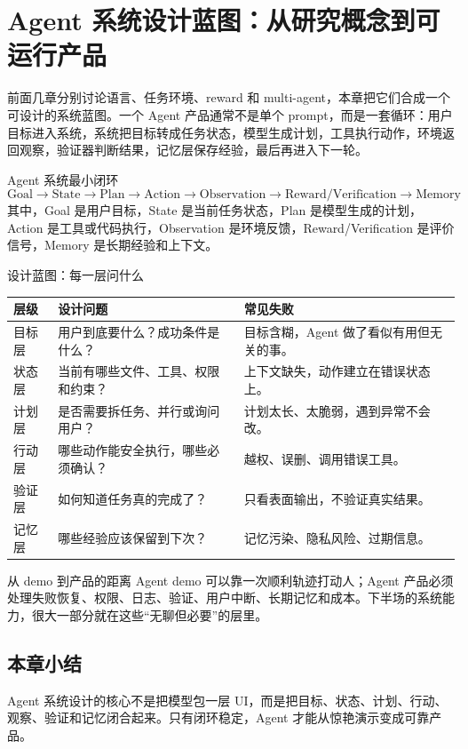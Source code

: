 \section{Agent 系统设计蓝图：从研究概念到可运行产品}

前面几章分别讨论语言、任务环境、reward 和 multi-agent，本章把它们合成一个可设计的系统蓝图。一个 Agent 产品通常不是单个 prompt，而是一套循环：用户目标进入系统，系统把目标转成任务状态，模型生成计划，工具执行动作，环境返回观察，验证器判断结果，记忆层保存经验，最后再进入下一轮。

\begin{importantbox}{Agent 系统最小闭环}
\[
\text{Goal} \rightarrow \text{State} \rightarrow \text{Plan} \rightarrow \text{Action} \rightarrow \text{Observation} \rightarrow \text{Reward/Verification} \rightarrow \text{Memory}
\]
其中，Goal 是用户目标，State 是当前任务状态，Plan 是模型生成的计划，Action 是工具或代码执行，Observation 是环境反馈，Reward/Verification 是评价信号，Memory 是长期经验和上下文。
\end{importantbox}

\begin{knowledgebox}{设计蓝图：每一层问什么}
\begin{tabularx}{\textwidth}{p{}p{}X}
\toprule
层级 & 设计问题 & 常见失败 \\
\midrule
目标层 & 用户到底要什么？成功条件是什么？ & 目标含糊，Agent 做了看似有用但无关的事。 \\
状态层 & 当前有哪些文件、工具、权限和约束？ & 上下文缺失，动作建立在错误状态上。 \\
计划层 & 是否需要拆任务、并行或询问用户？ & 计划太长、太脆弱，遇到异常不会改。 \\
行动层 & 哪些动作能安全执行，哪些必须确认？ & 越权、误删、调用错误工具。 \\
验证层 & 如何知道任务真的完成了？ & 只看表面输出，不验证真实结果。 \\
记忆层 & 哪些经验应该保留到下次？ & 记忆污染、隐私风险、过期信息。 \\
\bottomrule
\end{tabularx}
\end{knowledgebox}

\begin{warningbox}{从 demo 到产品的距离}
Agent demo 可以靠一次顺利轨迹打动人；Agent 产品必须处理失败恢复、权限、日志、验证、用户中断、长期记忆和成本。下半场的系统能力，很大一部分就在这些“无聊但必要”的层里。
\end{warningbox}

\subsection{本章小结}

Agent 系统设计的核心不是把模型包一层 UI，而是把目标、状态、计划、行动、观察、验证和记忆闭合起来。只有闭环稳定，Agent 才能从惊艳演示变成可靠产品。

